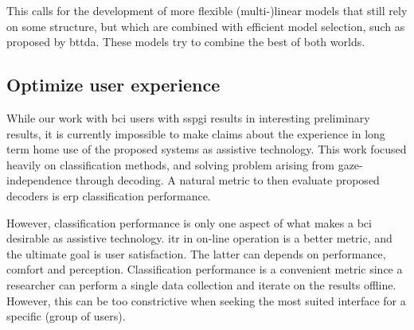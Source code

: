 This calls for the development of more flexible (multi-)linear models that still rely on some
structure, but which are combined with efficient model
selection, such as proposed by \ac{bttda}.
These models try to combine the best of both worlds.

%
%
%
%
%
%
%
%
\subsection{Optimize user experience}
While our work with \ac{bci} users with \ac{sspgi} results in interesting
preliminary results, it is currently impossible to make claims about the experience in long term
home use of the proposed systems as assistive technology.
This work focused heavily on classification methods, and solving problem
arising from gaze-independence through decoding.
A natural metric to then evaluate proposed decoders is \ac{erp} classification
performance.

However, classification performance is only one aspect of what makes a \ac{bci}
desirable as assistive technology.
\Ac{itr} in on-line operation is a better metric, and the ultimate goal
is user satisfaction.
The latter can depends on performance, comfort and perception.
Classification performance is a convenient metric since a researcher can perform a single
data collection and iterate on the results offline.
However, this can be too constrictive when seeking the most suited interface
for a specific (group of users).

